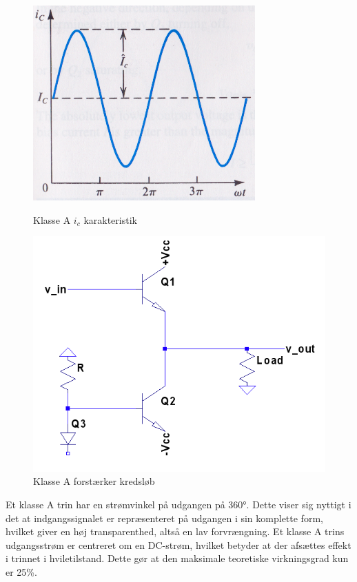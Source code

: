 \begin{figure}[ht]
\begin{minipage}[b]{0.5\linewidth}
\centering
\includegraphics[scale=.35]{indledende_analyse/klasser/klassea.png}
\caption{Klasse A $i_c$ karakteristik}
\label{fig:klassea}
\end{minipage}
\hspace{0.5cm}
\begin{minipage}[b]{0.5\linewidth}
\centering
\includegraphics[scale=.35]{indledende_analyse/klasser/classa.png}
\caption{Klasse A forstærker kredsløb}
\label{fig:classa}
\end{minipage}
\end{figure}


Et klasse A trin har en strømvinkel på udgangen på 360°. Dette viser sig nyttigt i det at indgangssignalet er repræsenteret på udgangen i sin komplette form, hvilket giver en høj transparenthed, altså en lav forvrængning.
Et klasse A trins udgangsstrøm er centreret om en DC-strøm, hvilket betyder at der afsættes effekt i trinnet i hviletilstand. Dette gør at den maksimale teoretiske virkningsgrad kun er 25\%.

